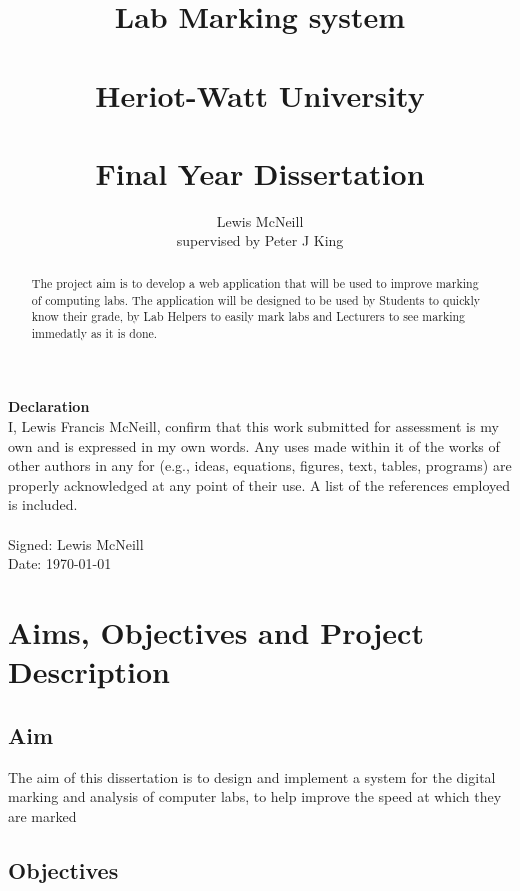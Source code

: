 \documentclass[12pt]{article}  %
\title{Lab Marking system \\~\\  \large{Heriot-Watt University} \\~\\ Final Year Dissertation}
\author{Lewis McNeill\\
supervised by
Peter J King}
\theoremstyle{definition}
\theoremstyle{remark}
\begin{document}
\maketitle
{}
\newpage 

\doublespacing
\textbf{\Large{Declaration}} \\[2em]
I, Lewis Francis McNeill, confirm that this work submitted for assessment is my own and is expressed in my own words. Any uses made within it of the works of other authors in any for (e.g., ideas, equations, figures, text, tables, programs) are properly acknowledged at any point of their use. A list of the references employed is included.
\\
\\
Signed: Lewis McNeill
\\
Date: \today

\newpage                     %
\begin{abstract}

The project aim is to develop a web application that will be used to improve marking of computing labs. The application will be designed to be used by Students to quickly know their grade, by Lab Helpers to easily mark labs and Lecturers to see marking immedatly as it is done.



\end{abstract}

\newpage                     %

\singlespacing
\tableofcontents
\doublespacing



\newpage                     %

\section{Aims, Objectives and Project Description}
\setcounter{page}{1}

\subsection{Aim}
The aim of this dissertation is to design and implement a system for the digital marking and analysis of computer labs, to help improve the speed at which they are marked

\subsection{Objectives}
\end{document}
